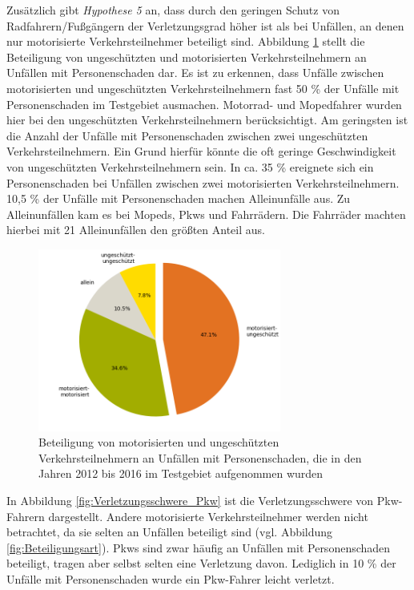 Zusätzlich gibt \textit{Hypothese 5} an, dass durch den geringen Schutz von Radfahrern/Fußgängern der Verletzungsgrad höher ist als bei Unfällen, an denen nur motorisierte Verkehrsteilnehmer beteiligt sind. Abbildung \ref{fig:Verkehrsbeteiligung_Personenschaden} stellt die Beteiligung von ungeschützten und motorisierten Verkehrsteilnehmern an Unfällen mit Personenschaden dar. Es ist zu erkennen, dass Unfälle zwischen motorisierten und ungeschützten Verkehrsteilnehmern fast 50 \% der Unfälle mit Personenschaden im Testgebiet ausmachen. Motorrad- und Mopedfahrer wurden hier bei den ungeschützten Verkehrsteilnehmern berücksichtigt. Am geringsten ist die Anzahl der Unfälle mit Personenschaden zwischen zwei ungeschützten Verkehrsteilnehmern. Ein Grund hierfür könnte die oft geringe Geschwindigkeit von ungeschützten Verkehrsteilnehmern sein. In ca. 35 \% ereignete sich ein Personenschaden bei Unfällen zwischen zwei motorisierten Verkehrsteilnehmern. 10,5 \% der Unfälle mit Personenschaden machen Alleinunfälle aus. Zu Alleinunfällen kam es bei Mopeds, Pkws und Fahrrädern. Die Fahrräder machten hierbei mit 21 Alleinunfällen den größten Anteil aus.

\begin{savenotes}
	\begin{figure}[H]
		\centering
		\includegraphics[width=8cm,height=6cm]{figures/motorisiert_ungeschuetzt}
		\caption[Beteiligung von motorisierten und ungeschützten Verkehrsteilnehmern an Unfällen mit Personenschaden, die in den Jahren 2012 bis 2016 im Testgebiet aufgenommen wurden]{Beteiligung von motorisierten und ungeschützten Verkehrsteilnehmern an Unfällen mit Personenschaden, die in den Jahren 2012 bis 2016 im Testgebiet aufgenommen wurden}\label{fig:Verkehrsbeteiligung_Personenschaden}
	\end{figure}
\end{savenotes}

In Abbildung \ref{fig:Verletzungsschwere_Pkw} ist die Verletzungsschwere von Pkw-Fahrern dargestellt. Andere motorisierte Verkehrsteilnehmer werden nicht betrachtet, da sie selten an Unfällen beteiligt sind (vgl. Abbildung \ref{fig:Beteiligungsart}). Pkws sind zwar häufig an Unfällen mit Personenschaden beteiligt, tragen aber selbst selten eine Verletzung davon. Lediglich in 10 \% der Unfälle mit Personenschaden wurde ein Pkw-Fahrer leicht verletzt.

